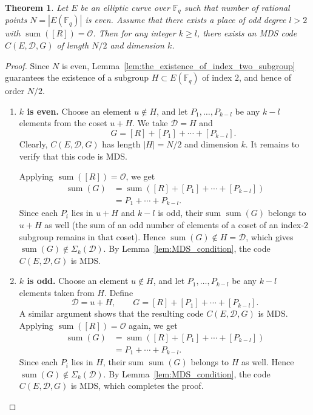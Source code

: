 \documentclass[journal,12pt,onecolumn]{IEEEtran}
\newtheorem{theorem}{Theorem}
\newcommand{\Point}{\operatorname{sum}}
\newcommand{\sumset}{\Sigma}
\begin{document}
\begin{theorem}\label{thm:construction_of_degree_greater_1}
Let $E$ be an elliptic curve over $\mathbb{F}_q$ such that number of rational points $N = |E(\mathbb{F}_q)|$ is even. Assume that there exists a 
place of odd degree $l>2 $ with $ \Point([R])  =  \mathcal{O}$. 
Then  for any integer $k \ge l$, there exists an MDS code $C(E, \mathcal{D}, G)$ of length $N/2$ and dimension $k$.
\end{theorem}
\begin{proof}
Since $N$ is even, Lemma~\ref{lem:the_existence_of_index_two_subgroup} guarantees the existence of a subgroup $H \subset E(\mathbb{F}_q)$ of index $2$, and hence of order $N/2$. 
\begin{enumerate}
    \item \textbf{$k$ is even.} Choose an element $u \notin H$, and let $P_1, \dots, P_{k-l}$ be any $k-l$ elements from the coset $u+H$. We take $\mathcal{D} = H$ and 
\[
 \qquad G = [R] + [P_1] + \cdots + [P_{k-l}].
\]
Clearly, $C(E, \mathcal{D}, G)$ has length $|H| = N/2$ and dimension $k$. It remains to verify that this code is MDS.

Applying $
\Point([R]) = \mathcal{O}
$, we get
\begin{align*}
\Point(G) &= \Point({[R] + [P_1] + \cdots + [P_{k-l}]}) \\
&= P_1 + \cdots + P_{k-l}.
\end{align*}
Since each $P_i$ lies in $u+H$ and $k-l$ is odd, their sum $\Point(G)$ belongs to $u+H$ as well (the sum of an odd number of elements of a coset of an index‑$2$ subgroup remains in that coset). Hence $\Point(G) \notin H = \mathcal{D}$, which gives $\Point(G) \notin \sumset_k(\mathcal{D})$. By Lemma~\ref{lem:MDS_condition}, the code $C(E, \mathcal{D}, G)$ is MDS.
    
    \item \textbf{$k$ is odd.} Choose an element $u \notin H$, and let $P_1, \dots, P_{k-l}$ be any $k-l$ elements taken from $H$. Define
\[
\mathcal{D} = u + H, \qquad G = [R] + [P_1] + \cdots + [P_{k-l}].
\]
A similar argument shows that the resulting code $C(E, \mathcal{D}, G)$ is MDS.
Applying $
\Point([R]) = \mathcal{O}
$ again, we get
\begin{align*}
\Point(G) &= \Point({[R] + [P_1] + \cdots + [P_{k-l}]}) \\
&= P_1 + \cdots + P_{k-l}.
\end{align*}
Since each $P_i$ lies in $H$, their sum $\Point(G)$ belongs to $H$ as well. Hence $\Point(G) \notin \sumset_k(\mathcal{D})$. By Lemma~\ref{lem:MDS_condition}, the code $C(E, \mathcal{D}, G)$ is MDS, which completes the proof.
\end{enumerate}

\end{proof}
\end{document}
